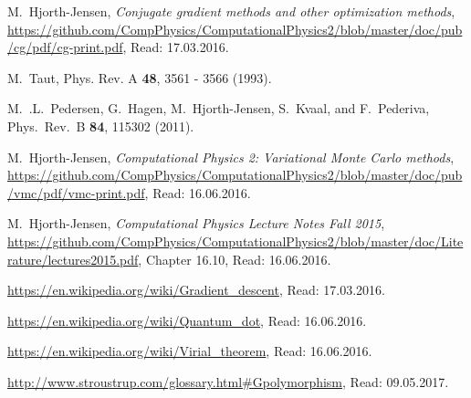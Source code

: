 \documentclass[../main.tex]{subfiles}
\begin{document}
\begin{thebibliography}{9}

 M.~Hjorth-Jensen, {\em Conjugate gradient methods and other optimization methods},  \url{https://github.com/CompPhysics/ComputationalPhysics2/blob/master/doc/pub/cg/pdf/cg-print.pdf}, Read: 17.03.2016.

 M.~Taut, Phys. Rev. A {\bf 48}, 3561 - 3566 (1993).

 M.~.L.~Pedersen, G.~Hagen, M.~Hjorth-Jensen, S.~Kvaal,  and F.~Pederiva, Phys.~Rev.~B {\bf 84}, 115302 (2011).

 M.~Hjorth-Jensen, \emph{Computational Physics 2: Variational Monte Carlo methods}, \url{https://github.com/CompPhysics/ComputationalPhysics2/blob/master/doc/pub/vmc/pdf/vmc-print.pdf}, Read: 16.06.2016.

 M.~Hjorth-Jensen, \emph{Computational Physics Lecture Notes Fall 2015},  \url{https://github.com/CompPhysics/ComputationalPhysics2/blob/master/doc/Literature/lectures2015.pdf}, Chapter 16.10, Read: 16.06.2016.

 \url{https://en.wikipedia.org/wiki/Gradient_descent}, Read: 17.03.2016.

 \url{https://en.wikipedia.org/wiki/Quantum_dot}, Read: 16.06.2016.

 \url{https://en.wikipedia.org/wiki/Virial_theorem}, Read: 16.06.2016.

 \url{http://www.stroustrup.com/glossary.html#Gpolymorphism}, Read: 09.05.2017.

\end{thebibliography}
\end{document}
